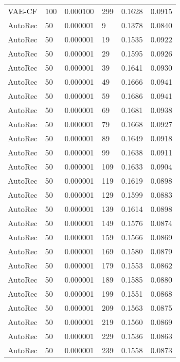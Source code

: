 \begin{tabular}{llrlrr}
  VAE-CF &  100 &  0.000100 &   299 &  0.1628 &       0.0915 \\
 AutoRec &   50 &  0.000001 &     9 &  0.1378 &       0.0840 \\
 AutoRec &   50 &  0.000001 &    19 &  0.1535 &       0.0922 \\
 AutoRec &   50 &  0.000001 &    29 &  0.1595 &       0.0926 \\
 AutoRec &   50 &  0.000001 &    39 &  0.1641 &       0.0930 \\
 AutoRec &   50 &  0.000001 &    49 &  0.1666 &       0.0941 \\
 AutoRec &   50 &  0.000001 &    59 &  0.1686 &       0.0941 \\
 AutoRec &   50 &  0.000001 &    69 &  0.1681 &       0.0938 \\
 AutoRec &   50 &  0.000001 &    79 &  0.1668 &       0.0927 \\
 AutoRec &   50 &  0.000001 &    89 &  0.1649 &       0.0918 \\
 AutoRec &   50 &  0.000001 &    99 &  0.1638 &       0.0911 \\
 AutoRec &   50 &  0.000001 &   109 &  0.1633 &       0.0904 \\
 AutoRec &   50 &  0.000001 &   119 &  0.1619 &       0.0898 \\
 AutoRec &   50 &  0.000001 &   129 &  0.1599 &       0.0883 \\
 AutoRec &   50 &  0.000001 &   139 &  0.1614 &       0.0898 \\
 AutoRec &   50 &  0.000001 &   149 &  0.1576 &       0.0874 \\
 AutoRec &   50 &  0.000001 &   159 &  0.1566 &       0.0869 \\
 AutoRec &   50 &  0.000001 &   169 &  0.1580 &       0.0879 \\
 AutoRec &   50 &  0.000001 &   179 &  0.1553 &       0.0862 \\
 AutoRec &   50 &  0.000001 &   189 &  0.1585 &       0.0880 \\
 AutoRec &   50 &  0.000001 &   199 &  0.1551 &       0.0868 \\
 AutoRec &   50 &  0.000001 &   209 &  0.1563 &       0.0875 \\
 AutoRec &   50 &  0.000001 &   219 &  0.1560 &       0.0869 \\
 AutoRec &   50 &  0.000001 &   229 &  0.1536 &       0.0863 \\
 AutoRec &   50 &  0.000001 &   239 &  0.1558 &       0.0873 \\

\end{tabular}
